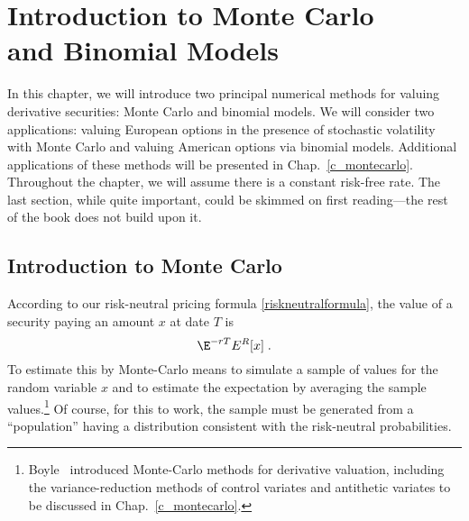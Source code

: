 \chapter[Introduction to Monte Carlo and Binomial Models]{Introduction to Monte Carlo\\ and Binomial Models}\label{c_introcomputation}

In this chapter, we will introduce two principal numerical methods for valuing derivative securities: Monte Carlo and binomial models.  We will consider two applications: valuing European options in the presence of stochastic volatility with Monte Carlo and valuing American options via binomial models.  Additional applications of these methods will be presented in Chap.~\ref{c_montecarlo}.  Throughout the chapter, we will assume there is a constant risk-free rate.  The last section, while quite important, could be skimmed on first reading---the rest of the book does not build upon it.

\section{Introduction to Monte Carlo}\label{s_mc_europeans}

According to our risk-neutral pricing formula \eqref{riskneutralformula}, the value of a security paying an amount $x$ at date $T$ is
\begin{equation}\label{montecarlo1}
\E^{-rT}E^R[x]\;.
\end{equation}
To estimate this by Monte-Carlo  means to simulate a sample of values for the random variable
$x$
and to estimate the expectation by averaging the sample values.\footnote{Boyle~\cite{boyle} introduced Monte-Carlo methods for derivative valuation, including the variance-reduction methods of control variates and antithetic variates to be discussed in Chap.~\ref{c_montecarlo}.}  Of course, for this to work, the sample must be generated from a ``population'' having a distribution consistent with the risk-neutral probabilities.

